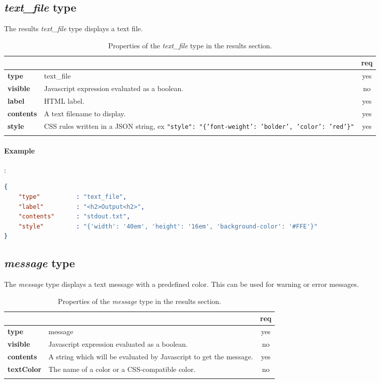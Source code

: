 \subsection{ \emph{text\_file} type}

The results \emph{text\_file} type displays a text file.

\begin{longtable}{|>{\bf}L{\linewidth}|L{\linewidth}|c|}
\hline
{}     &  & {\bf req} \tabularnewline 
\hline \hline
 type      & text\_file  & yes \\ \hline
 visible    & Javascript expression evaluated as a boolean. & no \\ \hline
 label     & HTML label. & yes \\ \hline
 contents  & A text filename to display. & yes \\ \hline
 style     & CSS rules written in a JSON string, ex 
             \texttt{"style": "\{'font-weight': 'bolder', 'color': 'red'\}"} & yes \\ \hline
\caption{Properties of the \emph{text\_file} type in the results section.}
\end{longtable}

\paragraph{Example}:\\
\begin{lstlisting}[language=json,firstnumber=1]
{ 
    "type"          : "text_file", 
    "label"         : "<h2>Output<h2>",
    "contents"      : "stdout.txt",
    "style"         : "{'width': '40em', 'height': '16em', 'background-color': '#FFE'}"
}
\end{lstlisting}


\subsection{ \emph{message} type}

The \emph{message} type displays a text message with a predefined color. This can be 
used for warning or error messages.

\begin{longtable}{|>{\bf}L{\linewidth}|L{\linewidth}|c|}
\hline
      &  & {\bf req} \tabularnewline 
\hline \hline
 type       & message  & yes \\ \hline
 visible    & Javascript expression evaluated as a boolean. & no \\ \hline
 contents   & A string which will be evaluated by Javascript to get the message. & yes \\ \hline
 textColor  & The name of a color or a CSS-compatible color. & no \\ \hline
\caption{Properties of the \emph{message} type in the results section.}
\end{longtable}

